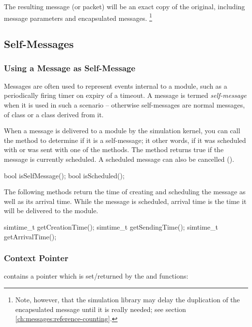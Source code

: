 The resulting message (or packet) will be an exact copy of the original,
including message parameters and encapsulated messages.
  \footnote{Note, however, that the simulation library may delay the
  duplication of the encapsulated message until it is really needed;
  see section \ref{ch:messages:reference-counting}.}


\subsection{Self-Messages}

\subsubsection{Using a Message as Self-Message}

Messages are often used to represent events internal to a module,
such as a periodically firing timer on expiry of a timeout.
A message is termed \textit{self-message} when it is used
in such a scenario -- otherwise self-messages are normal messages,
of class  or a class derived from it.

When a message is delivered to a module by the simulation kernel,
you can call the  method to determine if it is
a self-message; it other words, if it was scheduled with
 or was sent with one of the
 methods. The  method
returns true if the message is currently scheduled. A scheduled
message can also be cancelled ().

\begin{cpp}
bool isSelfMessage();
bool isScheduled();
\end{cpp}

The following methods return the time of creating and scheduling the message
as well as its arrival time. While the message is scheduled, arrival
time is the time it will be delivered to the module.

\begin{cpp}
simtime_t getCreationTime();
simtime_t getSendingTime();
simtime_t getArrivalTime();
\end{cpp}

\subsubsection{Context Pointer}

 contains a  pointer which is
set/returned by the  and
 functions:

